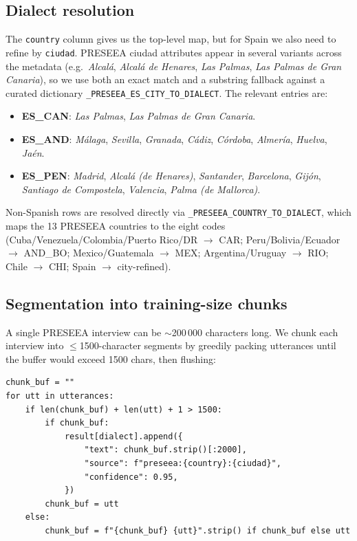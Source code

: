 \documentclass[11pt,a4paper]{article}
\begin{document}
\subsection{Dialect resolution}

The \texttt{country} column gives us the top-level map, but for Spain we
also need to refine by \texttt{ciudad}. PRESEEA ciudad attributes appear in
several variants across the metadata (e.g.\ \emph{Alcalá}, \emph{Alcalá
de Henares}, \emph{Las Palmas}, \emph{Las Palmas de Gran Canaria}), so we
use both an exact match and a substring fallback against a curated
dictionary \texttt{\_PRESEEA\_ES\_CITY\_TO\_DIALECT}. The relevant entries are:

\begin{itemize}
  \item \textbf{ES\_CAN}: \emph{Las Palmas}, \emph{Las Palmas de Gran Canaria}.
  \item \textbf{ES\_AND}: \emph{Málaga}, \emph{Sevilla}, \emph{Granada},
        \emph{Cádiz}, \emph{Córdoba}, \emph{Almería}, \emph{Huelva},
        \emph{Jaén}.
  \item \textbf{ES\_PEN}: \emph{Madrid}, \emph{Alcalá (de Henares)},
        \emph{Santander}, \emph{Barcelona}, \emph{Gijón}, \emph{Santiago
        de Compostela}, \emph{Valencia}, \emph{Palma (de Mallorca)}.
\end{itemize}

Non-Spanish rows are resolved directly via
\texttt{\_PRESEEA\_COUNTRY\_TO\_DIALECT}, which maps the 13 PRESEEA
countries to the eight codes (Cuba/Venezuela/Colombia/Puerto Rico/DR
$\to$ CAR; Peru/Bolivia/Ecuador $\to$ AND\_BO; Mexico/Guatemala $\to$
MEX; Argentina/Uruguay $\to$ RIO; Chile $\to$ CHI; Spain $\to$ city-refined).

\subsection{Segmentation into training-size chunks}

A single PRESEEA interview can be $\sim$200\,000 characters long. We
chunk each interview into $\leq$1500-character segments by greedily
packing utterances until the buffer would exceed 1500 chars, then
flushing:

\begin{lstlisting}[style=pycode,caption={PRESEEA segmentation.}]
chunk_buf = ""
for utt in utterances:
    if len(chunk_buf) + len(utt) + 1 > 1500:
        if chunk_buf:
            result[dialect].append({
                "text": chunk_buf.strip()[:2000],
                "source": f"preseea:{country}:{ciudad}",
                "confidence": 0.95,
            })
        chunk_buf = utt
    else:
        chunk_buf = f"{chunk_buf} {utt}".strip() if chunk_buf else utt
\end{lstlisting}
\end{document}
